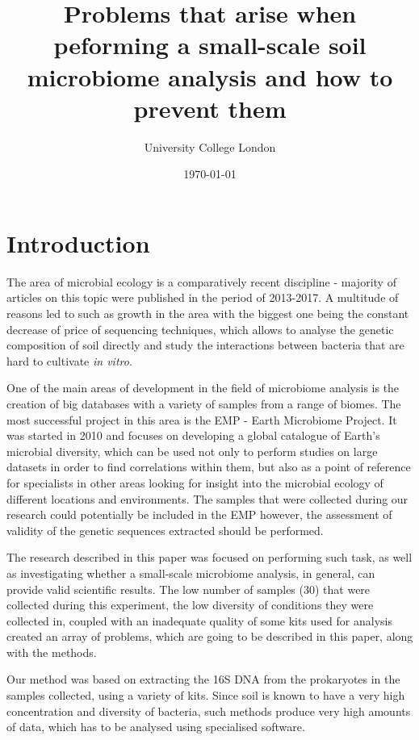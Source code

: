 \documentclass[12pt,twocolumn]{article} %
\title{Problems that arise when peforming a small-scale soil microbiome analysis and how to prevent them}
\author{\normalsize University College London \\}
\date{\today}
\begin{document}
	
\maketitle
%
%
\section{Introduction}
The area of microbial ecology is a comparatively recent discipline -  majority of articles on this topic were published in the period of 2013-2017. A multitude of reasons led to such as growth in the area with the biggest one being the constant decrease of price of sequencing techniques, which allows to analyse the genetic composition of soil directly and study the interactions between bacteria that are hard to cultivate \textit{in vitro}.
\par
One of the main areas of development in the field of microbiome analysis is the creation of big databases with a variety of samples from a range of biomes. The most successful project in this area is the EMP - Earth Microbiome Project\cite{Gilbert2014}. It was started in 2010 and focuses on developing a global catalogue of Earth's microbial diversity, which can be used not only to perform studies on large datasets in order to find correlations within them, but also as a point of reference for specialists in other areas looking for insight into the microbial ecology of different locations and environments. The samples that were collected during our research could potentially be included in the EMP however, the assessment of validity of the genetic sequences extracted should be performed.
\par
The research described in this paper was focused on performing such task, as well as investigating whether a small-scale microbiome analysis, in general, can provide valid scientific results. The low number of samples (30) that were collected during this experiment, the low diversity of conditions they were collected in, coupled with an inadequate quality of some kits used for analysis created an array of problems, which are going to be described in this paper, along with the methods.
\par
Our method was based on extracting the 16S DNA from the prokaryotes in the samples collected, using a variety of kits. Since soil is known to have a very high concentration and diversity of bacteria\cite{Nannipieri2003,Torsvik1996}, such methods produce very high amounts of data, which has to be analysed using specialised software.
%
\end{document}
